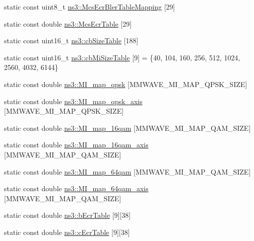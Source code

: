 \begin{DoxyCompactItemize}
\item 
static const uint8\+\_\+t \hyperlink{namespacens3_ad41f52d74f41546bde1a5d00c1eed016}{ns3\+::\+Mcs\+Ecr\+Bler\+Table\+Mapping} \mbox{[}29\mbox{]}
\item 
static const double \hyperlink{namespacens3_a5e80c75db664b51189d262e55aba06be}{ns3\+::\+Mcs\+Ecr\+Table} \mbox{[}29\mbox{]}
\item 
static const uint16\+\_\+t \hyperlink{namespacens3_a14a1917c5d5a089d32d5d29e3c380ab9}{ns3\+::cb\+Size\+Table} \mbox{[}188\mbox{]}
\item 
static const uint16\+\_\+t \hyperlink{namespacens3_a466a5fd8f869eb3630151a510d79c5e0}{ns3\+::cb\+Mi\+Size\+Table} \mbox{[}9\mbox{]} = \{40, 104, 160, 256, 512, 1024, 2560, 4032, 6144\}
\item 
static const double \hyperlink{namespacens3_ab414a3ee5e274a6ddc4ddbea4f8c02f9}{ns3\+::\+M\+I\+\_\+map\+\_\+qpsk} \mbox{[}M\+M\+W\+A\+V\+E\+\_\+\+M\+I\+\_\+\+M\+A\+P\+\_\+\+Q\+P\+S\+K\+\_\+\+S\+I\+ZE\mbox{]}
\item 
static const double \hyperlink{namespacens3_ac69fc51a6048fa3c9bb33723539d6080}{ns3\+::\+M\+I\+\_\+map\+\_\+qpsk\+\_\+axis} \mbox{[}M\+M\+W\+A\+V\+E\+\_\+\+M\+I\+\_\+\+M\+A\+P\+\_\+\+Q\+P\+S\+K\+\_\+\+S\+I\+ZE\mbox{]}
\item 
static const double \hyperlink{namespacens3_af2002ec52557c96619783c92265fa976}{ns3\+::\+M\+I\+\_\+map\+\_\+16qam} \mbox{[}M\+M\+W\+A\+V\+E\+\_\+\+M\+I\+\_\+\+M\+A\+P\+\_\+Q\+A\+M\+\_\+\+S\+I\+ZE\mbox{]}
\item 
static const double \hyperlink{namespacens3_a944415ae017037d262bc7a7dd57ad54b}{ns3\+::\+M\+I\+\_\+map\+\_\+16qam\+\_\+axis} \mbox{[}M\+M\+W\+A\+V\+E\+\_\+\+M\+I\+\_\+\+M\+A\+P\+\_\+Q\+A\+M\+\_\+\+S\+I\+ZE\mbox{]}
\item 
static const double \hyperlink{namespacens3_a6466c26cbb214866876e87858cc13bce}{ns3\+::\+M\+I\+\_\+map\+\_\+64qam} \mbox{[}M\+M\+W\+A\+V\+E\+\_\+\+M\+I\+\_\+\+M\+A\+P\+\_\+Q\+A\+M\+\_\+\+S\+I\+ZE\mbox{]}
\item 
static const double \hyperlink{namespacens3_a0a60d17efaa01019e177d1218ae0c4d3}{ns3\+::\+M\+I\+\_\+map\+\_\+64qam\+\_\+axis} \mbox{[}M\+M\+W\+A\+V\+E\+\_\+\+M\+I\+\_\+\+M\+A\+P\+\_\+Q\+A\+M\+\_\+\+S\+I\+ZE\mbox{]}
\item 
static const double \hyperlink{namespacens3_aa3d7232f450cb4b832a47c4df5175c4d}{ns3\+::b\+Ecr\+Table} \mbox{[}9\mbox{]}\mbox{[}38\mbox{]}
\item 
static const double \hyperlink{namespacens3_a3905bbb06635b77635374f14d2458705}{ns3\+::c\+Ecr\+Table} \mbox{[}9\mbox{]}\mbox{[}38\mbox{]}
\end{DoxyCompactItemize}
